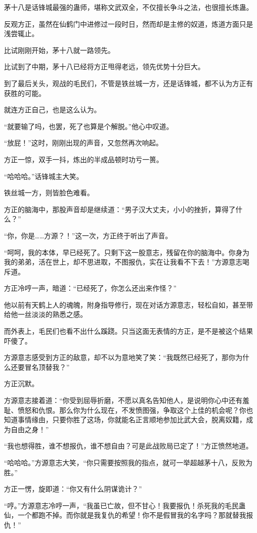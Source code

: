 \begin{this_body}
茅十八是话锋城最强的蛊师，堪称文武双全，不仅擅长争斗之法，也很擅长炼蛊。

反观方正，虽然在仙鹤门中进修过一段时日，然而却是主修的奴道，炼道方面只是浅尝辄止。

比试刚刚开始，茅十八就一路领先。

比试到了中期，茅十八已经将方正甩得老远，领先优势十分巨大。

到了最后关头，观战的毛民们，不管是铁丝城一方，还是话锋城，都不认为方正有获胜的可能。

就连方正自己，也是这么认为。

“就要输了吗，也罢，死了也算是个解脱。”他心中叹道。

“放屁！”这时，刚刚出现的声音，又忽然再次响起。

方正一惊，双手一抖，炼出的半成品顿时功亏一篑。

“哈哈哈。”话锋城主大笑。

铁丝城一方，则皆脸色难看。

方正的脑海中，那股声音却是继续道：“男子汉大丈夫，小小的挫折，算得了什么？”

“你，你是……方源？！”这一次，方正终于听出了声音。

“呵呵，我的本体，早已经死了。只剩下这一股意志，残留在你的脑海中。你身为我的弟弟，活在世上，却不思进取，不图报仇，实在让我看不下去！”方源意志喝斥道。

方正冷哼一声，暗道：“已经死了，你怎么还出来作怪？”

他以前有天鹤上人的魂魄，附身指导修行，现在对话方源意志，轻松自如，甚至带给他一丝淡淡的熟悉之感。

而外表上，毛民们也看不出什么蹊跷。只当这面无表情的方正，是不是被这个结果吓傻了。

方源意志感受到方正的敌意，却不以为意地笑了笑：“我既然已经死了，那你为什么还要冒名顶替我？”

方正沉默。

方源意志接着道：“你受到屈辱折磨，不愿以真名告知他人，是说明你心中还有羞耻、愤怒和仇恨。那么你为什么现在，不发愤图强，争取这个上佳的机会呢？你也知道事情缘由，只要你胜了这场，你就能名正言顺地参加比武大会，脱离奴籍，成为自由之身！”

“我也想得胜，谁不想报仇，谁不想自由？可是此战败局已定了！”方正愤然地道。

“哈哈哈。”方源意志大笑，“你只需要按照我的指点，就可一举超越茅十八，反败为胜。”

方正一愣，旋即道：“你又有什么阴谋诡计？”

“哼。”方源意志冷哼一声，“我虽已亡故，但不甘心！我要报仇！杀死我的毛民蛊仙，一个都跑不掉。而你就是我复仇的希望！你不是假冒我的名字吗？那就替我报仇！”


\end{this_body}
